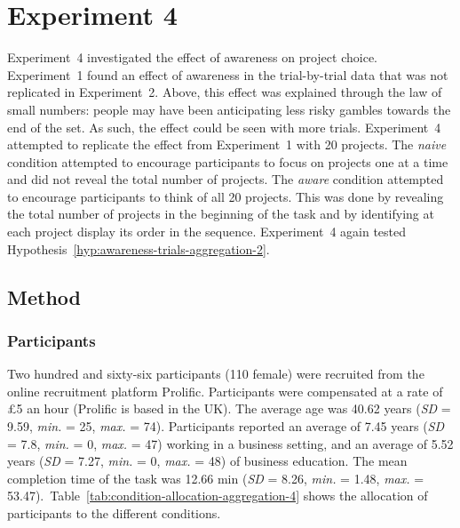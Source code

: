 \documentclass[a4paper, nobind]{templates/ociamthesis}
\theoremstyle{definition}
\theoremstyle{definition}
\theoremstyle{definition}
\theoremstyle{definition}
\theoremstyle{remark}
\begin{document}
\hypertarget{aggregation-4}{%
\section{Experiment 4}\label{aggregation-4}}

Experiment~4 investigated the effect of awareness on project choice.
Experiment~1 found an effect of awareness in the trial-by-trial data that was
not replicated in Experiment~2. Above, this effect was explained through the law
of small numbers: people may have been anticipating less risky gambles towards
the end of the set. As such, the effect could be seen with more trials.
Experiment~4 attempted to replicate the effect from Experiment~1 with 20
projects. The \emph{naive} condition attempted to encourage participants to focus on
projects one at a time and did not reveal the total number of projects. The
\emph{aware} condition attempted to encourage participants to think of all 20
projects. This was done by revealing the total number of projects in the
beginning of the task and by identifying at each project display its order in
the sequence. Experiment~4 again tested
Hypothesis~\ref{hyp:awareness-trials-aggregation-2}.

\subsection{Method}

\subsubsection{Participants}

Two hundred and sixty-six participants (110 female) were recruited from the online recruitment platform Prolific. Participants were compensated at a rate of \pounds 5 an hour (Prolific is based in the UK). The average age was 40.62 years (\emph{SD} = 9.59, \emph{min.} = 25, \emph{max.} = 74). Participants reported an average of 7.45 years (\emph{SD} = 7.8, \emph{min.} = 0, \emph{max.} = 47) working in a business setting, and an average of 5.52 years (\emph{SD} = 7.27, \emph{min.} = 0, \emph{max.} = 48) of business education. The mean completion time of the task was 12.66 min (\emph{SD} = 8.26, \emph{min.} = 1.48, \emph{max.} = 53.47).~Table~\ref{tab:condition-allocation-aggregation-4}
shows the allocation of participants to the different conditions.
\end{document}
